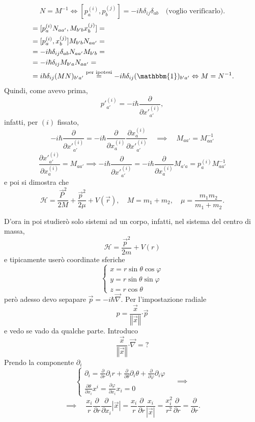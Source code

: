 \[
\boxed{N = M^{-1} \Leftrightarrow [p_a^{(i)}, p_b^{(j)}] = -i\hbar\delta_{ij}\delta_{ab}} \quad \text{(voglio verificarlo)}.
\]
\begin{align*}
[{p'}_{a'}^{(i)}, {x'}_{b'}^{(j)}] &= [p_a^{(i)}N_{aa'}, M_{b'b} x_b^{(j)}] = \\
&= [p_a^{(i)}, x_b^{(j)}] M_{b'b} N_{aa'} = \\
&= -i\hbar\delta_{ij}\delta_{ab}N_{aa'}M_{b'b} = \\
&= -i\hbar\delta_{ij}M_{b'a}N_{aa'} = \\
&= i\hbar\delta_{ij} (MN)_{b'a'} \stackrel{\text{per ipotesi}}{=} -i\hbar\delta_{ij}(\mathbbm{1})_{b'a'} \Leftrightarrow M = N^{-1}.
\end{align*}
Quindi, come avevo prima,
\[
{p'}_{a'}^{(i)} = -i\hbar\frac{\partial}{\partial {x'}_{a'}^{(i)}},
\]
infatti, per \( (i) \) fissato,
\[
-i\hbar \frac{\partial}{\partial {x'}_{a'}^{(i)}} = -i\hbar \frac{\partial}{\partial x_a^{(i)}} \frac{\partial x_a^{(i)}}{\partial {x'}_{a'}^{(i)}} \quad \implies \quad M_{aa'} = M_{aa'}^{-1}
\]
\[
\frac{\partial {x'}_{a'}^{(i)}}{\partial x_a^{(i)}} = M_{aa'} \implies -i\hbar\frac{\partial}{\partial {x'}_{a'}^{(i)}} = -i\hbar \frac{\partial}{\partial x_a^{(i)}} M_{a'a} = p_a^{(i)} M_{aa'}^{-1}
\]
e poi si dimostra che 
\[
\mathcal{H} = \frac{\vec{P}^2}{2M} + \frac{\vec{p}^2}{2\mu} + V(\vec{r}), \quad M = m_1 + m_2, \quad \mu = \frac{m_1 m_2}{m_1 + m_2}.
\]

D'ora in poi studierò solo sistemi ad un corpo, infatti, nel sistema del centro di massa,
\[
\mathcal{H} = \frac{\vec{p}^2}{2m} + V(r)
\]
e tipicamente userò coordinate sferiche 
\[
\begin{cases}
x = r \sin \theta \cos \varphi \\
y = r \sin \theta \sin \varphi \\
z = r \cos \theta
\end{cases}
\]
però adesso devo sepapare \( \vec{p} = -i\hbar \vec{\nabla} \). Per l'impostazione radiale
\[
\hat{p} = \frac{\vec{x}}{\left\Vert \vec{x} \right\Vert} \mathbf{\cdot} \vec{p}
\]
e vedo se vado da qualche parte. Introduco 
\[
\frac{\vec{x}}{\left\Vert \vec{x} \right\Vert} \mathbf{\cdot} \vec{\nabla} = ?
\]
Prendo la componente \( \partial_i \)
\[
\begin{cases}
\partial_i = \frac{\partial}{\partial r} \partial_i r + \frac{\partial}{\partial \theta} \partial_i \theta + \frac{\partial}{\partial \varphi} \partial_i \varphi \\
\frac{\partial \theta}{\partial x_i} x^i = \frac{\partial \varphi}{\partial x_i} x_i = 0
\end{cases} \quad \implies
\]
\[
\implies \quad \frac{x_i}{r} \frac{\partial}{\partial r} \frac{\partial}{\partial x_i} |\vec{x}| = \frac{x_i}{r} \frac{\partial}{\partial r} \frac{x_i}{|\vec{x}|} = \frac{x_i^2}{r^2} \frac{\partial}{\partial r} = \frac{\partial}{\partial r}.
\]

